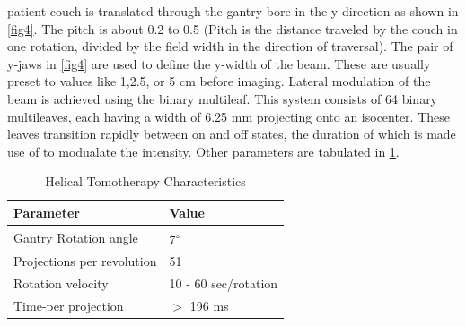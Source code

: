 \documentclass[10pt,journal,compsoc]{IEEEtran} %
\begin{document}
  patient couch is translated through the gantry bore in the y-direction as 
  shown in \ref{fig4}\protect{}. The pitch is about 0.2 to 0.5 
  (Pitch is the distance traveled by the couch in one rotation, divided by the 
  field width in the direction of traversal). The pair of y-jaws in 
  \ref{fig4}\protect{} are used to define the y-width of the beam. 
  These are usually preset to values like 1,2.5, or 5 cm before imaging. 
  Lateral modulation of the beam is achieved using the binary multileaf. This 
  system consists of 64 binary multileaves, each having a width of 6.25 mm 
  projecting onto an isocenter. These leaves transition rapidly between on 
  and off states, the duration of which is made use of to modualate the 
  intensity. Other parameters are tabulated in \ref{tab1}.
  \begin{table}[t]
    \centering
    \caption{Helical Tomotherapy Characteristics}
    \begin{tabularx}{1\linewidth}{XX}
      \toprule[0.4mm]
      \textbf{Parameter} & \textbf{Value} \\
      \midrule[0.4mm]
      Gantry Rotation angle & 
      7\textsuperscript{$\circ$} \\
      Projections per revolution & 51 \\
      Rotation velocity & 10 - 60 sec/rotation \\
      Time-per projection & $>$ 196 ms \\
      \bottomrule
    \end{tabularx}%
    \label{tab1}%
  \end{table}%
\end{document}
